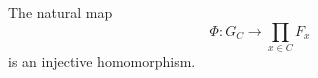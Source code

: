 \documentclass[preview]{standalone}
\begin{document}
\begin{center}
The natural map \[\Phi : G_{C} \to \prod_{x \in C} F_{x}\] is an injective homomorphism.
\end{center}
\end{document}
